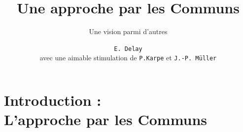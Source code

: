 \documentclass[newPxFont]{beamer}
\title{Une approche par les Communs}
\subtitle{Une vision parmi d'autres}
\author{\texttt{E. Delay}\\
avec une aimable stimulation de \texttt{P.Karpe} et \texttt{J.-P. Müller}}
\institute{CIRAD -- UMR SENS}
\begin{document}
%
%


\maketitle


%
%


\section{Introduction :\\ L'approche par les Communs}
\end{document}
